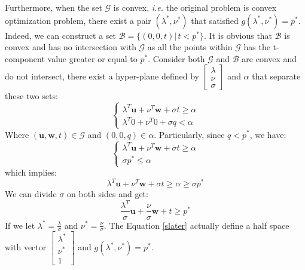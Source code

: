 \documentclass[10pt,a4paper]{article}
\begin{document}
Furthermore, when the set $\mathcal{G}$ is convex, \textsl{i.e.} the original problem is convex optimization problem, there exist a pair $(\lambda^{*}, \nu^{*})$ that satisfied $g(\lambda^{*}, \nu^{*}) = p^{*}$. Indeed, we can construct a set $\mathcal{B} = \{ (0, 0, t) |\, t < p^{*} \}$. It is obvious that $\mathcal{B}$ is convex and has no intersection with $\mathcal{G}$ as all the points within $\mathcal{G}$ has the t-component value greater or equal to $p^{*}$. Consider both $\mathcal{G}$ and $\mathcal{B}$ are convex and do not intersect, there exist a hyper-plane defined by $\begin{bmatrix}
\lambda \\
\nu \\
\sigma
\end{bmatrix}$ and $\alpha$ that separate these two sets:
\begin{equation}
	\begin{cases}
		\lambda^{T} \mathbf{u} + \nu^{T} \mathbf{w} + \sigma t \geq \alpha \\ 
		\lambda^{T} 0 + \nu^{T} 0 + \sigma q < \alpha
	\end{cases}
\end{equation}
Where $(\mathbf{u}, \mathbf{w}, t) \in \mathcal{G}$ and $(0, 0, q) \in \alpha$. Particularly, since $q < p^{*}$, we have:
\begin{equation}
	\begin{cases}
		\lambda^{T} \mathbf{u} + \nu^{T} \mathbf{w} + \sigma t \geq \alpha \\ 
		\sigma p^{*} \leq \alpha
	\end{cases}
\end{equation}
which implies:
\begin{equation}
	\lambda^{T} \mathbf{u} + \nu^{T} \mathbf{w} + \sigma t \geq \alpha \geq \sigma p^{*}
\end{equation}
We can divide $\sigma$ on both sides and get:
\begin{equation}
	\frac{\lambda^{T}}{\sigma} \mathbf{u} + \frac{\nu}{\sigma} \mathbf{w} + t \geq p^{*}
	\label{slater}
\end{equation}
If we let $\lambda^{*} = \frac{\lambda}{\sigma}$ and $\nu^{*} = \frac{\nu}{\sigma}$. The Equation \ref{slater} actually define a half space with vector $\begin{bmatrix}
\lambda^{*} \\
\nu^{*} \\
1
\end{bmatrix}$ and $g(\lambda^{*}, \nu^{*}) = p^{*}$.
\end{document}
